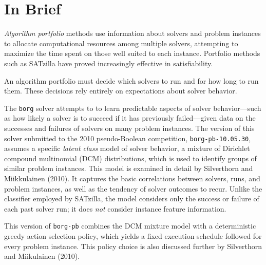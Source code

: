 \section{In Brief}

\emph{Algorithm portfolio} methods \cite{Huberman1997Economics} use information
about solvers and problem instances to allocate computational resources among
multiple solvers, attempting to maximize the time spent on those well suited to
each instance. Portfolio methods such as SATzilla \cite{Xu2008SATzilla} have
proved increasingly effective in satisfiability.

An algorithm portfolio must decide which solvers to run and for how long to run
them. These decisions rely entirely on expectations about solver behavior.

The {\tt borg} solver attempts to to learn predictable aspects of solver
behavior---such as how likely a solver is to succeed if it has previously
failed---given data on the successes and failures of solvers on many problem
instances. The version of this solver submitted to the 2010 pseudo-Boolean
competition, {\tt borg-pb-10.05.30}, assumes a specific \emph{latent class}
model of solver behavior, a mixture of Dirichlet compound multinomial (DCM)
distributions, which is used to identify groups of similar problem instances.
This model is examined in detail by Silverthorn and Miikkulainen
(2010)\nocite{Silverthorn2010latent}. It captures the basic correlations
between solvers, runs, and problem instances, as well as the tendency of solver
outcomes to recur. Unlike the classifier employed by SATzilla, the model
considers only the success or failure of each past solver run; it does
\emph{not} consider instance feature information.

This version of {\tt borg-pb} combines the DCM mixture model with a
deterministic greedy action selection policy, which yields a fixed execution
schedule followed for every problem instance. This policy choice is also
discussed further by Silverthorn and Miikulainen (2010).

